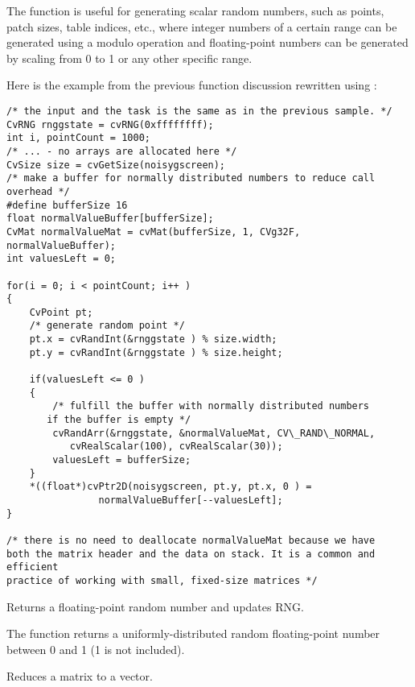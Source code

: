 The function is useful for generating scalar random numbers, such as
points, patch sizes, table indices, etc., where integer numbers of a certain
range can be generated using a modulo operation and floating-point numbers
can be generated by scaling from 0 to 1 or any other specific range.

\ifC
Here is the example from the previous function discussion rewritten using
:

\begin{lstlisting}
/* the input and the task is the same as in the previous sample. */
CvRNG rnggstate = cvRNG(0xffffffff);
int i, pointCount = 1000;
/* ... - no arrays are allocated here */
CvSize size = cvGetSize(noisygscreen);
/* make a buffer for normally distributed numbers to reduce call overhead */
#define bufferSize 16
float normalValueBuffer[bufferSize];
CvMat normalValueMat = cvMat(bufferSize, 1, CVg32F, normalValueBuffer);
int valuesLeft = 0;

for(i = 0; i < pointCount; i++ )
{
    CvPoint pt;
    /* generate random point */
    pt.x = cvRandInt(&rnggstate ) % size.width;
    pt.y = cvRandInt(&rnggstate ) % size.height;

    if(valuesLeft <= 0 )
    {
        /* fulfill the buffer with normally distributed numbers 
	   if the buffer is empty */
        cvRandArr(&rnggstate, &normalValueMat, CV\_RAND\_NORMAL, 
		   cvRealScalar(100), cvRealScalar(30));
        valuesLeft = bufferSize;
    }
    *((float*)cvPtr2D(noisygscreen, pt.y, pt.x, 0 ) = 
				normalValueBuffer[--valuesLeft];
}

/* there is no need to deallocate normalValueMat because we have
both the matrix header and the data on stack. It is a common and efficient
practice of working with small, fixed-size matrices */
\end{lstlisting}
\fi

Returns a floating-point random number and updates RNG.


\begin{description}
\end{description}


The function returns a uniformly-distributed random floating-point number between 0 and 1 (1 is not included).

Reduces a matrix to a vector.

